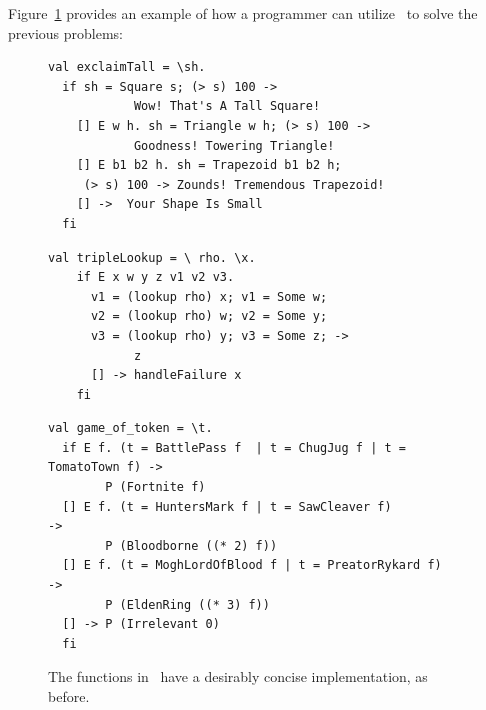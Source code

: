 \documentclass[article,screen,12pt, nonacm]{acmart}
\begin{document}
    Figure~\ref{fig:vminusfuncs} provides an example of how a programmer can
    utilize \VMinus\ to solve the previous problems: 
    
    
    \begin{figure}[ht] 
      \begin{minipage}[h]{0.54\linewidth}
        \vmlst 
        \begin{lstlisting}[numbers=none, basicstyle=\tiny, xleftmargin=.2em,
          showstringspaces=false,
          frame=single]
val exclaimTall = \sh.
  if sh = Square s; (> s) 100 -> 
            Wow! That's A Tall Square!  
    [] E w h. sh = Triangle w h; (> s) 100 ->
            Goodness! Towering Triangle!
    [] E b1 b2 h. sh = Trapezoid b1 b2 h; 
     (> s) 100 -> Zounds! Tremendous Trapezoid!
    [] ->  Your Shape Is Small
  fi 
  \end{lstlisting}
          \label{fig:vmexclaimtall} 
      \end{minipage}%
      \begin{minipage}[h]{0.5\linewidth}
        \vmlst 
        \begin{lstlisting}[numbers=none, basicstyle=\tiny, xleftmargin=2em,
                      frame=single]
  val tripleLookup = \ rho. \x.
    if E x w y z v1 v2 v3. 
      v1 = (lookup rho) x; v1 = Some w; 
      v2 = (lookup rho) w; v2 = Some y; 
      v3 = (lookup rho) y; v3 = Some z; -> 
            z 
      [] -> handleFailure x
    fi 
   \end{lstlisting}
            \label{fig:vmtriplelookup} 
        \vspace{4ex}
      \end{minipage} 
      \begin{minipage}[h]{\linewidth}
        \vmlst 
        \begin{lstlisting}[numbers=none, basicstyle=\tiny, xleftmargin=9em,
          showstringspaces=false,
          frame=single]
val game_of_token = \t. 
  if E f. (t = BattlePass f  | t = ChugJug f | t = TomatoTown f) -> 
        P (Fortnite f)
  [] E f. (t = HuntersMark f | t = SawCleaver f)                 -> 
        P (Bloodborne ((* 2) f))
  [] E f. (t = MoghLordOfBlood f | t = PreatorRykard f)          -> 
        P (EldenRing ((* 3) f))
  [] -> P (Irrelevant 0)
  fi 
\end{lstlisting}
          \label{fig:vmgot}
      \vspace{4ex}
      \end{minipage}%
      \caption{The functions in \VMinus\ have a desirably concise
      implementation, as before.}
  \label{fig:vminusfuncs}
    \end{figure}   
\end{document}
